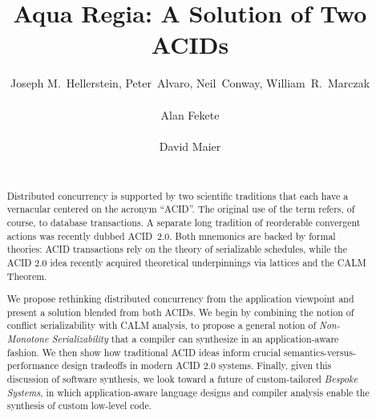 \documentclass{sig-alternate}
\begin{document}

\title{{\ttlit Aqua Regia}: A Solution of Two ACIDs}
\author{
\alignauthor
Joseph M.~Hellerstein, Peter~Alvaro, Neil~Conway, William~R.~Marczak\\
       \\
\alignauthor
Alan Fekete\\
       \\
\alignauthor
David Maier\\
       \\
}

\maketitle
\begin{abstract}
  Distributed concurrency is supported by two scientific traditions that each
  have a vernacular centered on the acronym ``ACID''.  The original use of
  the term refers, of course, to database transactions. A separate long
  tradition of reorderable convergent actions was recently dubbed
  ACID~2.0.  Both mnemonics are backed by formal theories:
  ACID transactions rely on the theory of serializable schedules, while the ACID
  2.0 idea recently acquired theoretical underpinnings via lattices and the CALM
  Theorem.

  We propose rethinking distributed concurrency from the application viewpoint
  and present a solution blended from both ACIDs.  We begin by combining the
  notion of conflict serializability with CALM analysis, to propose a general
  notion of \emph{Non-Monotone Serializability} that a compiler can synthesize
  in an application-aware fashion.  We then show how traditional ACID ideas
  inform crucial semantics-versus-performance design tradeoffs in modern ACID
  2.0 systems.  Finally, given this discussion of software synthesis, we look
  toward a future of custom-tailored \emph{Bespoke Systems}, in which
  application-aware language designs and compiler analysis enable the synthesis
  of custom low-level code.
\end{abstract}
\end{document}

